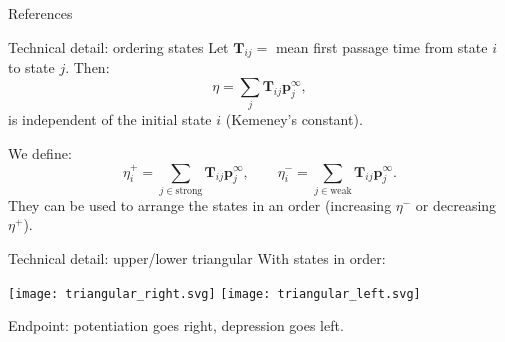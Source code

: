 \documentclass{beamer}%
\newcommand{\pr}{\mathbf{p}}
\newcommand{\eq}{\pr^\infty}
\newcommand{\fpt}{\mathbf{T}}
\begin{document}
\begin{frame}[allowframebreaks]{References}
%

 {\small
 
 
 }
%
\end{frame}


\begin{frame}[label=fr_tech]{Technical detail: ordering states}
%
 Let $\fpt_{ij}=$ mean first passage time from state $i$ to state $j$.
 Then:
 \begin{equation*}
   \eta = \sum_j \fpt_{ij} \eq_j,
 \end{equation*}
 is independent of the initial state $i$
 (Kemeney's constant).\\ 

 \vp We define:
 \begin{equation*}
   \eta^+_i = \sum_{j\in\text{strong}} \fpt_{ij} \eq_j,
   \qquad
   \eta^-_i = \sum_{j\in\text{weak}} \fpt_{ij} \eq_j.
 \end{equation*}
 They can be used to arrange the states in an order (increasing $\eta^-$ or decreasing $\eta^+$).
 \hyperlink{fr_areaproof}{}
%
\end{frame}


\begin{frame}{Technical detail: upper/lower triangular}
%
 With states in order:
 \begin{center}
   \texttt{[image: triangular\_right.svg]}
   \hp \hp \hp
   \texttt{[image: triangular\_left.svg]}
 \end{center}
 Endpoint: potentiation goes right, depression goes left.

 \hyperlink{fr_areaproof}{}
%
\end{frame}


\end{document}
